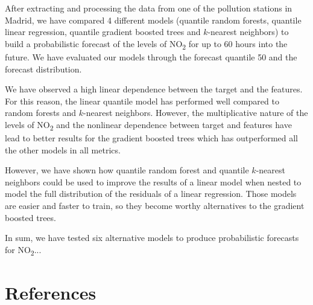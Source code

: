 \documentclass[a4paper,twocolumn,5p]{elsarticle}
\begin{document}
After extracting and processing the data from one of the pollution
stations in Madrid, we have compared 4 different models (quantile
random forests, quantile linear regression, quantile gradient boosted 
trees and
$k$-nearest neighbors) to build a probabilistic forecast of the levels
of NO\textsubscript{2} for up to 60 hours into the future. We have
evaluated our models through the forecast quantile 50 and the forecast
distribution.

We have observed a high linear dependence between the target and the
features. For this reason, the linear quantile model has performed
well compared to random forests and $k$-nearest neighbors. However,
the multiplicative nature of the levels of NO\textsubscript{2} and the
nonlinear dependence between target and features have lead to better
results for the gradient boosted trees which has outperformed all the
other models in all metrics.

However, we have shown how quantile random forest and quantile
$k$-nearest neighbors could be used to improve the results of a linear
model when nested to model the full distribution of the residuals of a
linear regression. Those models are easier and faster to train, so
they become worthy alternatives to the gradient boosted trees.

In sum, we have tested six alternative models to produce probabilistic
forecasts for NO\textsubscript{2}... 

\section{References}


\end{document}
